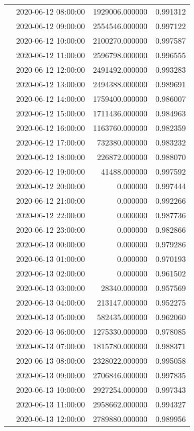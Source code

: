 \begin{tabular}{llrr}
 & 2020-06-12 08:00:00 & 1929006.000000 & 0.991312 \\
 & 2020-06-12 09:00:00 & 2554546.000000 & 0.997122 \\
 & 2020-06-12 10:00:00 & 2100270.000000 & 0.997587 \\
 & 2020-06-12 11:00:00 & 2596798.000000 & 0.996555 \\
 & 2020-06-12 12:00:00 & 2491492.000000 & 0.993283 \\
 & 2020-06-12 13:00:00 & 2494388.000000 & 0.989691 \\
 & 2020-06-12 14:00:00 & 1759400.000000 & 0.986007 \\
 & 2020-06-12 15:00:00 & 1711436.000000 & 0.984963 \\
 & 2020-06-12 16:00:00 & 1163760.000000 & 0.982359 \\
 & 2020-06-12 17:00:00 & 732380.000000 & 0.983232 \\
 & 2020-06-12 18:00:00 & 226872.000000 & 0.988070 \\
 & 2020-06-12 19:00:00 & 41488.000000 & 0.997592 \\
 & 2020-06-12 20:00:00 & 0.000000 & 0.997444 \\
 & 2020-06-12 21:00:00 & 0.000000 & 0.992266 \\
 & 2020-06-12 22:00:00 & 0.000000 & 0.987736 \\
 & 2020-06-12 23:00:00 & 0.000000 & 0.982866 \\
 & 2020-06-13 00:00:00 & 0.000000 & 0.979286 \\
 & 2020-06-13 01:00:00 & 0.000000 & 0.970193 \\
 & 2020-06-13 02:00:00 & 0.000000 & 0.961502 \\
 & 2020-06-13 03:00:00 & 28340.000000 & 0.957569 \\
 & 2020-06-13 04:00:00 & 213147.000000 & 0.952275 \\
 & 2020-06-13 05:00:00 & 582435.000000 & 0.962060 \\
 & 2020-06-13 06:00:00 & 1275330.000000 & 0.978085 \\
 & 2020-06-13 07:00:00 & 1815780.000000 & 0.988371 \\
 & 2020-06-13 08:00:00 & 2328022.000000 & 0.995058 \\
 & 2020-06-13 09:00:00 & 2706846.000000 & 0.997835 \\
 & 2020-06-13 10:00:00 & 2927254.000000 & 0.997343 \\
 & 2020-06-13 11:00:00 & 2958662.000000 & 0.994327 \\
 & 2020-06-13 12:00:00 & 2789880.000000 & 0.989956 \\

\end{tabular}

